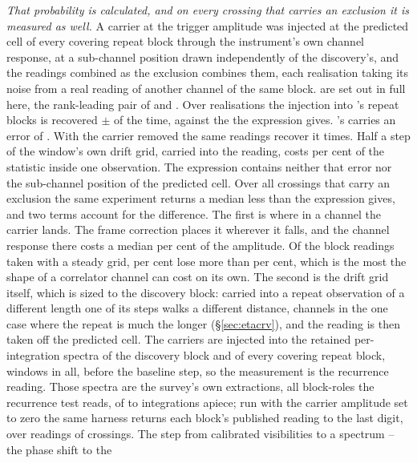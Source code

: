 \emph{That probability is calculated, and on every crossing that carries an
exclusion it is measured as well.} A
carrier at the trigger amplitude was injected at the predicted cell of every
covering repeat block through the instrument's own channel response, at a
sub-channel position drawn independently of the discovery's, and the readings
combined as the exclusion combines them, each realisation taking its noise
from a real reading of another channel of the same block. \RjNMeas{} are set out in full here, the
rank-leading pair of \EvAStar{} and \EvBStar. Over \RjNReal{} realisations
the injection into \EvAStar's repeat blocks is recovered
\RjMeasSx$\pm$\RjErrSx{} of the time, against the \RqPowerTrigSx{} the
expression gives. \EvBStar's carries an error of \RjErrCp. With the carrier removed the same readings recover it
\RjNFalse{} times.
Half a step of the window's own drift grid, carried into the reading, costs
\RjDriftPct{} per cent of the statistic inside one observation. The
expression contains neither that error nor the sub-channel position of the
predicted cell. Over all \HjNMeas{} crossings that carry an exclusion the
same experiment returns a median \HjDevMed{} less than the expression gives,
and two terms account for the difference. The first is where in a channel the
carrier lands. The frame correction places it wherever it falls, and the
channel response there costs a median \HjRespMedPct{} per cent of the
amplitude. Of the \HjNSteady{} block readings taken with a steady grid,
\HjRespOutPct{} per cent lose more than \HjRespBoundPct{} per cent, which is
the most the shape of a correlator channel can cost on its own. The second is the drift grid itself,
which is sized to the discovery block: carried into a repeat observation of a
different length one of its steps walks a different distance, \HjEtaWalkCh{}
channels in the one case where the repeat is much the longer
(\S\ref{sec:etacrv}), and the reading is then taken off the predicted
cell. The carriers are injected into the retained per-integration spectra of
the discovery block and of every covering repeat block, \GpNRoleInj{} windows
in all, before the baseline step, so the measurement is the
recurrence reading. Those spectra are the survey's own extractions, all \GpNRole{}
block-roles the recurrence test reads, of \GpNIntLo{} to \GpNIntHi{}
integrations apiece; run with the carrier amplitude set to zero the same
harness returns each block's published reading to the last digit, over
\GpNullBlock{} readings of \GpNullStar{} crossings. The
step from calibrated visibilities to a spectrum -- the phase shift to the
